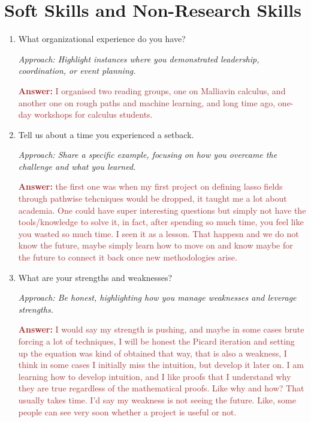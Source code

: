 \documentclass[12pt]{article}
\numberwithin{equation}{section}
\newcommand{\brown}[1]{\textcolor{brown}{#1}}
\begin{document}
\section{Soft Skills and Non-Research Skills}
\begin{enumerate}
    \item What organizational experience do you have?
    
    \textit{Approach: Highlight instances where you demonstrated leadership, coordination, or event planning.}

    \brown{\textbf{Answer:} I organised two reading groups, one on Malliavin calculus, and another one on rough paths and machine learning, and long time ago, one-day workshops for calculus students.}

    \item Tell us about a time you experienced a setback.
    
    \textit{Approach: Share a specific example, focusing on how you overcame the challenge and what you learned.}

    \brown{\textbf{Answer:} the first one was when my first project on defining lasso fields through pathwise tehcniques would be dropped, it taught me a lot about academia. One could have super interesting questions but simply not have the tools/knowledge to solve  it, in fact, after spending so much time, you feel like you wasted so much time. I seen it as a lesson. That happesn and we do not know the future, maybe simply learn how to move on and know maybe for the future to connect it back once new methodologies arise. }

    \item What are your strengths and weaknesses?
    
    \textit{Approach: Be honest, highlighting how you manage weaknesses and leverage strengths.}

    \brown{\textbf{Answer:} I would say my strength is pushing, and maybe in some cases brute forcing a lot of techniques, I will be honest the Picard iteration and setting up the equation was kind of obtained that way, that is also a weakness, I think in some cases I initially miss the intuition, but develop it later on. I am learning how to develop intuition, and I like proofs that I understand why they are true regardless of the mathematical proofs. Like why and how? That usually takes time. I'd say my weakness is not seeing the future. Like, some people can see very soon whether a project is useful or not.}
    

\end{enumerate}
\end{document}
